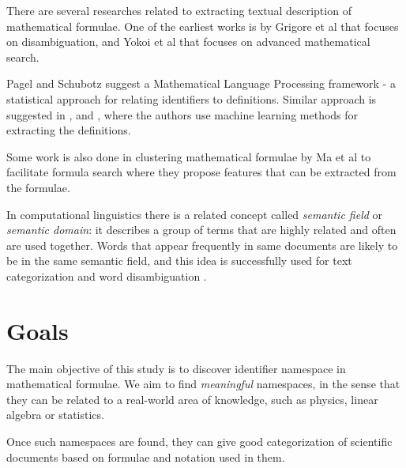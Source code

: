 \documentclass[12pt,a4paper]{article}
\begin{document}
There are several researches related to extracting textual description of mathematical formulae. One of the earliest works is by Grigore et al \cite{source:grigore09} that focuses on disambiguation,
and Yokoi et al \cite{source:yokoi11} that focuses on advanced mathematical search.

Pagel and Schubotz \cite{source:mlpp} suggest a Mathematical Language Processing framework - a statistical approach for relating identifiers to definitions. Similar approach is suggested in \cite{source:yokoi11}, \cite{source:kristianto14} and \cite{source:kristianto12}, where the authors use machine learning methods for extracting the definitions.

Some work is also done in clustering mathematical formulae by Ma et al \cite{source:ma10} to facilitate formula search where they propose features that can be extracted from the formulae.

In computational linguistics there is a related concept called \emph{semantic field} or \emph{semantic domain}: it describes a group of terms that are highly related and often are used together. Words that appear frequently in same documents are likely to be in the same semantic field, and this idea is successfully used for text categorization and word disambiguation \cite{source:gliozzo09}.


\section{Goals}

The main objective of this study is to discover identifier namespace in mathematical formulae.
We aim to find \emph{meaningful} namespaces, in the sense that they can be related to a real-world area of knowledge, such as physics, linear algebra or statistics.


Once such namespaces are found, they can give good categorization of scientific documents based on formulae and notation used in them.

\end{document}
